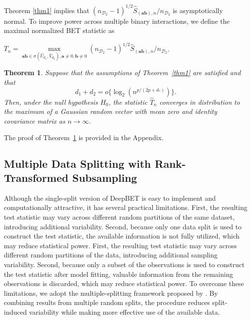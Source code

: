 \documentclass[12pt,reqno,oneside]{amsbook}
\newtheorem{theorem}{Theorem}[chapter]
\theoremstyle{definition}
\theoremstyle{remark}
\begin{document}
\hspace{0.5cm}
Theorem \ref{thm1} implies that
$(n_{\mathcal{D}_2}-1)^{1/2}\hat{S}_{(\mathbf{a}\mathbf{b}),n}/n_{\mathcal{D}_2}$
is asymptotically normal. To improve power across multiple binary interactions, we define the maximal normalized BET statistic as
\begin{center}
    $T_{n} = \max\limits_{\mathbf{ab}\in\sigma(\hat{U}_{d_1}, \hat{V}_{d_2}),\mathbf{a}\neq 0, \mathbf{b}\neq 0}(n_{\mathcal{D}_2}-1)^{1/2}\hat{S}_{(\mathbf{a}\mathbf{b}),n}/n_{\mathcal{D}_2}$. 
\end{center}

\begin{theorem}
\label{thm2}
Suppose that the assumptions of Theorem~\ref{thm1} are satisfied and that
\[
d_1+d_2=o\{\log_2(n^{p/(2p+d_*)})\}.
\]
Then, under the null hypothesis $H_0$, the statistic $\hat{T}_n$ converges in distribution to the maximum of a Gaussian random vector with mean zero and identity covariance matrix as $n\rightarrow\infty$.
\end{theorem}

The proof of Theorem~\ref{thm2} is provided in the Appendix.

\subsection{Multiple Data Splitting with Rank-Transformed Subsampling}

Although the single-split version of DeepBET is easy to implement and computationally attractive, it has several practical limitations. First, the resulting test statistic may vary across different random partitions of the same dataset, introducing additional variability. Second, because only one data split is used to construct the test statistic, the available information is not fully utilized, which may reduce statistical power. First, the resulting test statistic may vary across different random partitions of the data, introducing additional sampling variability. Second, because only a subset of the observations is used to construct the test statistic after model fitting, valuable information from the remaining observations is discarded, which may reduce statistical power. To overcome these limitations, we adopt the multiple-splitting framework proposed by \cite{guo2024ranktransformed}. By combining results from multiple random splits, the procedure reduces split-induced variability while making more effective use of the available data.
\end{document}
